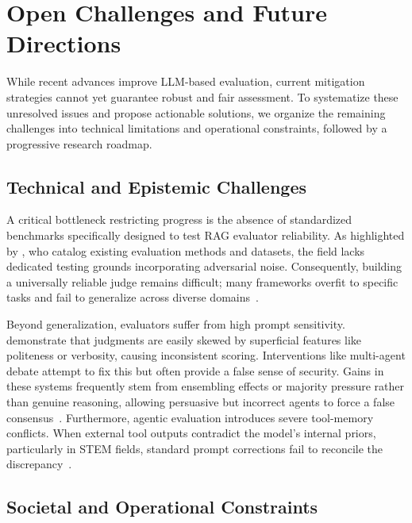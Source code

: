 \section{Open Challenges and Future Directions}

While recent advances improve LLM-based evaluation, current mitigation strategies cannot yet guarantee robust and fair assessment. To systematize these unresolved issues and propose actionable solutions, we organize the remaining challenges into technical limitations and operational constraints, followed by a progressive research roadmap.

\subsection{Technical and Epistemic Challenges}

A critical bottleneck restricting progress is the absence of standardized benchmarks specifically designed to test RAG evaluator reliability. As highlighted by \citet{Brehme_2025}, who catalog existing evaluation methods and datasets, the field lacks dedicated testing grounds incorporating adversarial noise. Consequently, building a universally reliable judge remains difficult; many frameworks overfit to specific tasks and fail to generalize across diverse domains~\cite{agent_judge, auto_eval_judge}.

Beyond generalization, evaluators suffer from high prompt sensitivity. \citet{comm_systems} demonstrate that judgments are easily skewed by superficial features like politeness or verbosity, causing inconsistent scoring. Interventions like multi-agent debate attempt to fix this but often provide a false sense of security. Gains in these systems frequently stem from ensembling effects or majority pressure rather than genuine reasoning, allowing persuasive but incorrect agents to force a false consensus~\cite{debate_limit}. Furthermore, agentic evaluation introduces severe tool-memory conflicts. When external tool outputs contradict the model's internal priors, particularly in STEM fields, standard prompt corrections fail to reconcile the discrepancy~\cite{tool_conflict}. 

\subsection{Societal and Operational Constraints}


